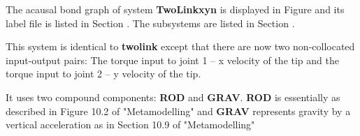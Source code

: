 

   The acausal bond graph of system \textbf{TwoLinkxyn} is
   displayed in Figure  and its label
   file is listed in Section .
   The subsystems are listed in Section .

This system is identical to  \textbf{twolink} except that there are
now two non-collocated input-output pairs: The torque input to joint 1
-- x velocity of the tip and the torque input to joint 2
-- y velocity of the tip. 

It uses two compound components: {\bf ROD} and {\bf GRAV}.  {\bf ROD}
is essentially as described in Figure 10.2 of "Metamodelling" and {\bf
GRAV} represents gravity by a vertical acceleration as in Section
10.9 of "Metamodelling"

